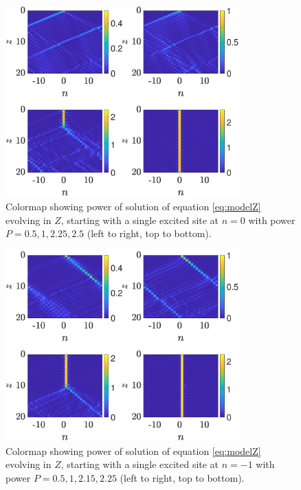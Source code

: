 \documentclass[reprint, amsmath,amssymb,aps,pre]{revtex4-2}
\begin{document}
\begin{figure}
    \centering
    \includegraphics[width=9cm]{timestep0.eps}
    \caption{Colormap showing power of solution of equation \cref{eq:modelZ} evolving in $Z$, starting with a single excited site at $n=0$ with power $P=0.5,1,2.25,2.5$ (left to right, top to bottom). }
    \label{fig:timestep0}
\end{figure}

\begin{figure}
    \centering
    \includegraphics[width=9cm]{timestep1.eps}
    \caption{Colormap showing power of solution of equation \cref{eq:modelZ} evolving in $Z$, starting with a single excited site at $n=-1$ with power $P=0.5,1,2.15,2.25$ (left to right, top to bottom).}
    \label{fig:timestep1}
\end{figure}
\end{document}
